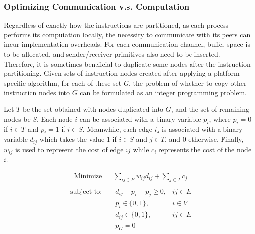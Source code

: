 \documentclass{sig-alternate}
\begin{document}

\subsubsection{Optimizing Communication v.s. Computation}
\label{opt}
 Regardless of exactly how the instructions are partitioned, as each process performs its computation locally, the necessity to communicate with its peers can incur implementation overheads.
For each communication channel, buffer space is to be allocated, and sender/receiver primitives also need to be inserted. Therefore, it is sometimes beneficial to duplicate some nodes after the instruction partitioning. Given sets of instruction nodes created after applying a platform-specific algorithm, for each of these set $G$, the problem of whether to copy other instruction nodes into $G$ can be formulated as an integer programming problem. 

Let $T$ be the set obtained with nodes duplicated into $G$, and the set of remaining nodes be $S$. Each node $i$ can be associated with a binary variable $p_i$, where $p_i = 0$ if $i \in T$ and $p_i = 1$ if $i \in S$. Meanwhile, each edge $ij$ is associated with
a binary variable $d_{ij}$ which takes the value 1 if $i \in S$ and $j \in T$, and 0 otherwise. Finally, $w_{ij}$ is used to represent the cost of edge $ij$
while $c_i$ represents the cost of the node $i$.


\begin{equation}
\begin{aligned}
\label{ilpopt}
& {\text{Minimize}} & & \underset{ij \in E}\sum w_{ij}d_{ij} +  \underset{j \in T}\sum c_j \\
\end{aligned}
\end{equation}
\begin{equation*}
\begin{aligned}
& \text{subject to: }
& &  d_{ij} - p_i+p_j \ge 0, & ij \in E \\
& &  & p_i \in \{0,1\}, & i \in V \\
& & & d_{ij} \in \{0,1\}, & ij \in E \\
& & & p_{G} = 0
\end{aligned}
\end{equation*}
\end{document}
